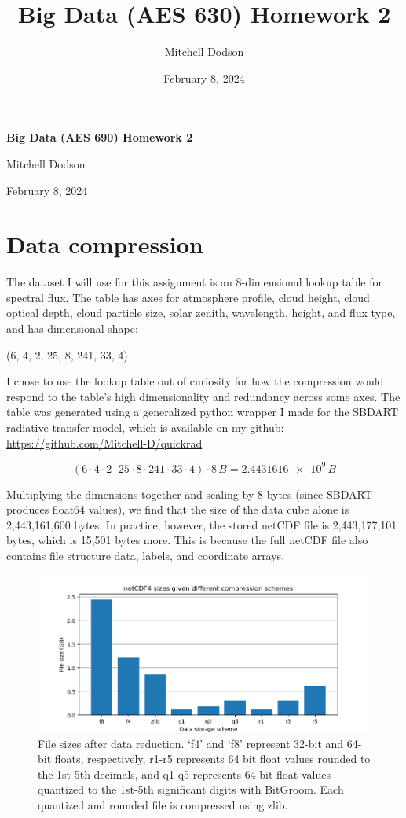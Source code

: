 \documentclass[11pt]{article}
\title{Big Data (AES 630) Homework 2}
\author{Mitchell Dodson}
\date{February 8, 2024}
\begin{document}
\noindent
{\Large\textbf{Big Data (AES 690) Homework 2}}

\noindent
\large{Mitchell Dodson}

\noindent
\large{February 8, 2024}

\section{Data compression}

The dataset I will use for this assignment is an 8-dimensional lookup table for spectral flux. The table has axes for atmosphere profile, cloud height, cloud optical depth, cloud particle size, solar zenith, wavelength, height, and flux type, and has dimensional shape:

\begin{center}
    (6, 4, 2, 25, 8, 241, 33, 4)
\end{center}

I chose to use the lookup table out of curiosity for how the compression would respond to the table's high dimensionality and redundancy across some axes. The table was generated using a generalized python wrapper I made for the SBDART radiative transfer model, which is available on my github: \url{https://github.com/Mitchell-D/quickrad}

\begin{equation}
    (6 \cdot 4 \cdot 2 \cdot 25  \cdot 8 \cdot 241 \cdot 33 \cdot 4) \cdot 8\,\si{B} = \num{2.4431616e9}\,\si{B}
\end{equation}

Multiplying the dimensions together and scaling by 8 bytes (since SBDART produces float64 values), we find that the size of the data cube alone is 2,443,161,600 bytes. In practice, however, the stored netCDF file is 2,443,177,101 bytes, which is 15,501 bytes more. This is because the full netCDF file also contains file structure data, labels, and coordinate arrays.

\begin{figure}[h!]
    \centering

    \includegraphics[width=.7\paperwidth]{figs/sizes.png}

    \caption{File sizes after data reduction. `f4' and `f8' represent 32-bit and 64-bit floats, respectively, r1-r5 represents 64 bit float values rounded to the 1st-5th decimals, and q1-q5 represents 64 bit float values quantized to the 1st-5th significant digits with BitGroom. Each quantized and rounded file is compressed using zlib.}
    \label{sizes}
\end{figure}
\end{document}
